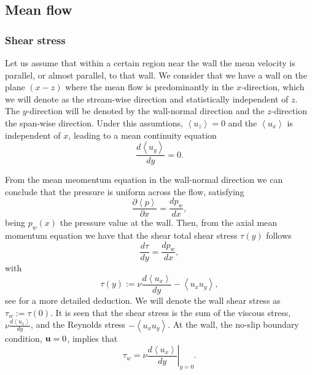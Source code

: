 \subsection{Mean flow}
\subsubsection{Shear stress}
Let us assume that within a certain region near the wall the mean velocity is parallel, or almost parallel, to that wall. We consider that we have a wall on the plane $ (x-z) $ where the mean flow is predominantly in the $ x $-direction, which we will denote as the stream-wise direction and statistically independent of $ z $. The $ y $-direction will be denoted by the wall-normal direction and the $ z $-direction the span-wise direction. Under this assumtions, $ \left\langle u_z\right\rangle=0 $ and the $ \left\langle u_x\right\rangle $ is independent of $ x $, leading to a mean continuity equation
\begin{equation}
\label{eq-mean_continuity}
\frac{d\left\langle u_y\right\rangle}{dy}=0.
\end{equation}

From the mean meomentum equation in the wall-normal direction we can conclude that the pressure is uniform across the flow, satisfying $$ \frac{\partial\left\langle p\right\rangle}{\partial x}=\frac{d p_w}{dx}, $$ being $ p_w(x) $ the pressure value at the wall. Then, from the axial mean momentum equation we have that the shear total shear stress $ \tau(y) $ follows
\begin{equation}
\label{eq-shear_stress_law}
\frac{d\tau}{dy}=\frac{d p_w}{dx},
\end{equation}
with
\begin{equation}
\label{eq-shear_stress}
\tau(y):=\nu\frac{d\left\langle u_x\right\rangle}{dy}-\left\langle u_xu_y\right\rangle,
\end{equation}
see \cite{pope_turbulent_2000} for a more detailed deduction. We will denote the wall shear stress as $ \tau_w:=\tau(0) $. It is seen that the shear stress is the sum of the viscous stress, $ \nu\frac{d\left\langle u_x\right\rangle}{dy} $, and the Reynolds stress $ -\left\langle u_xu_y\right\rangle $. At the wall, the no-slip boundary condition, $ {\bf u}=0 $, implies that
\begin{equation}
\label{eq-wall_shear_stress}
\tau_w=\nu\left.\frac{d\left\langle u_x\right\rangle}{dy}\right|_{y=0}.
\end{equation}

